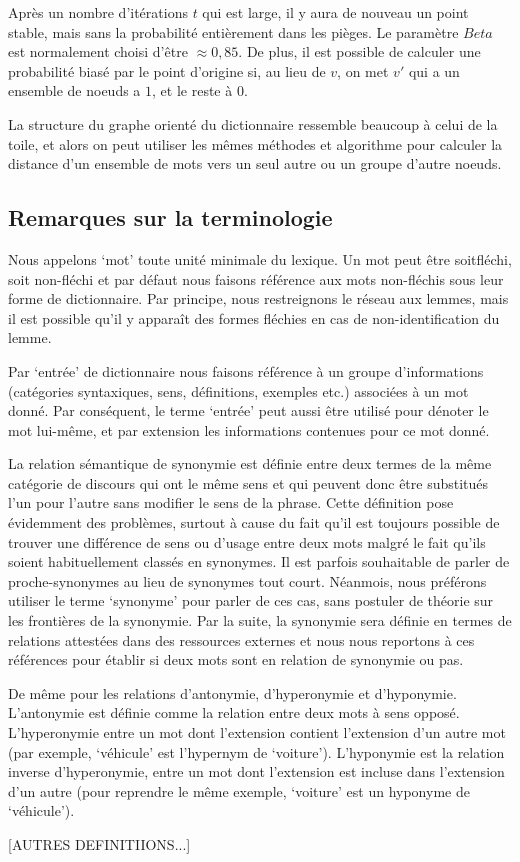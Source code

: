 Après un nombre d'itérations $t$ qui est large, il y aura de nouveau un point stable,
mais sans la probabilité entièrement dans les pièges. Le paramètre $Beta$ est normalement
choisi d'être  $\approx 0,85$. De plus, il est possible de calculer une probabilité
biasé par le point d'origine si, au lieu de $v$, on met $v'$ qui a un ensemble de
noeuds a $1$, et le reste à $0$.

La structure du graphe orienté du dictionnaire ressemble beaucoup à celui de la toile,
et alors on peut utiliser les mêmes méthodes et algorithme pour calculer la distance
d'un ensemble de mots vers un seul autre ou un groupe d'autre noeuds.


\subsection{Remarques sur la terminologie}
Nous appelons `mot' toute unité minimale du lexique. Un mot peut être
soitfléchi, soit non-fléchi et par défaut nous faisons référence aux mots 
non-fléchis sous leur forme de dictionnaire. Par principe, nous restreignons le 
réseau aux lemmes, mais il est possible qu'il y apparaît des formes fléchies en 
cas de non-identification du lemme.

Par `entrée' de dictionnaire nous faisons référence à un groupe d'informations 
(catégories syntaxiques, sens, définitions, exemples etc.) associées à un mot 
donné. Par conséquent, le terme `entrée' peut aussi être utilisé pour dénoter 
le mot lui-même, et par extension les informations contenues pour ce mot donné.

La relation sémantique de synonymie est définie entre deux termes de la même 
catégorie de discours qui ont le même sens et qui peuvent donc être substitués 
l'un pour l'autre sans modifier le sens de la phrase. Cette définition pose 
évidemment des problèmes, surtout à cause du fait qu'il est toujours possible 
de trouver une différence de sens ou d'usage entre deux mots malgré le fait 
qu'ils soient habituellement classés en synonymes. Il est parfois souhaitable 
de parler de proche-synonymes au lieu de synonymes tout court. Néanmois, 
nous préférons utiliser le terme `synonyme' pour parler de ces cas, sans 
postuler de théorie sur les frontières de la synonymie. Par la suite, la 
synonymie sera définie en termes de relations attestées dans des ressources 
externes et nous nous reportons à ces références pour établir si deux mots sont 
en relation de synonymie ou pas.

De même pour les relations d'antonymie, d'hyperonymie et d'hyponymie. 
L'antonymie est définie comme la relation entre deux mots à sens opposé. 
L'hyperonymie entre un mot dont l'extension contient l'extension d'un autre mot 
(par exemple, `véhicule' est l'hypernym de `voiture'). L'hyponymie est la 
relation inverse d'hyperonymie, entre un mot dont l'extension est incluse dans 
l'extension d'un autre (pour reprendre le même exemple, `voiture' est un 
hyponyme de `véhicule').

[AUTRES DEFINITIIONS...]

